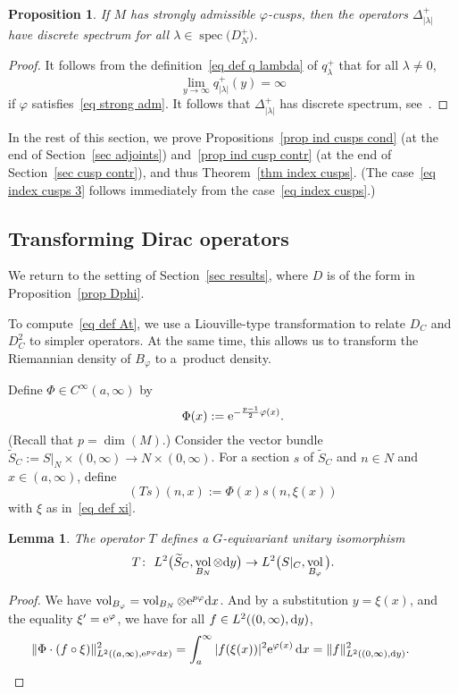 \documentclass[pdftex]{sigma}%
\numberwithin{equation}{section}
\newtheorem{Lemma}[Theorem]{Lemma}
\newtheorem{Proposition}[Theorem]{Proposition}
 { \theoremstyle{definition}
\newtheorem{Definition}[Theorem]{Definition}
\newtheorem{Note}[Theorem]{Note}
\newtheorem{Example}[Theorem]{Example}
\newtheorem{Remark}[Theorem]{Remark} }
\DeclareMathOperator{\spec}{spec}
\DeclareMathOperator{\vol}{vol}
\begin{document}
\begin{Proposition}\label{prop discrete spec}
If $M$ has strongly admissible $\varphi$-cusps, then the operators $\Delta_{|\lambda|}^{+}$ have discrete spectrum for all $\lambda \in \spec\big(D_N^+\big)$.
\end{Proposition}
\begin{proof}
It follows from the definition~\eqref{eq def q lambda} of $q_{\lambda}^{+}$ that for all $\lambda \not=0$,
\[
\lim_{y \to \infty}q_{|\lambda|}^{+}(y) = \infty
\]
if $\varphi$ satisfies~\eqref{eq strong adm}. It follows that $\Delta_{|\lambda|}^{+}$ has discrete spectrum, see~\cite[Theorem~1.3.1, Lemma~3.1.1 and equation~(1.3)]{Levitan91}.
\end{proof}

In the rest of this section, we prove Propositions~\ref{prop ind cusps cond} (at the end of Section~\ref{sec adjoints}) and~\ref{prop ind cusp contr} (at the end of Section~\ref{sec cusp contr}), and thus Theorem~\ref{thm index cusps}. (The case~\eqref{eq index cusps 3} follows immediately from the case~\eqref{eq index cusps}.)

\subsection{Transforming Dirac operators}

We return to the setting of Section~\ref{sec results}, where $D$ is of the form in Proposition~\ref{prop Dphi}.

To compute~\eqref{eq def At}, we use a Liouville-type transformation to relate $D_C$ and $D_C^2$ to simpler operators. At the same time, this allows us to transform the Riemannian density of $B_{\varphi}$ to a~product density.

Define $\Phi \in C^{\infty}(a, \infty)$ by
\begin{equation} \label{eq def Phi}
\Phi(x) := {\rm e}^{-\frac{p-1}{2}\varphi(x)}.
\end{equation}
(Recall that $p = \dim(M)$.)
Consider the vector bundle $\widetilde{S}_C := S|_N \times (0,\infty) \to N \times (0, \infty)$. For a section $s$ of $\widetilde{S}_C$ and $n \in N$ and $x \in (a,\infty)$, define
\[
(Ts)(n,x) := \Phi(x) s(n, \xi(x))
\]
with $\xi$ as in~\eqref{eq def xi}.
\begin{Lemma}\label{lem T isom}
The operator $T$ defines a $G$-equivariant unitary isomorphism
\[
T\colon \ L^2\big(\widetilde{S}_C, \vol_{B_N} \otimes {\rm d}y\big) \to L^2\big(S|_C, \vol_{B_{\varphi}}\big).
\]
\end{Lemma}
\begin{proof}
We have
$\vol_{B_{\varphi}} = \vol_{B_N} \otimes {\rm e}^{p\varphi} {\rm d}x$.
And by a substitution $y = \xi(x)$, and the equality $\xi' = {\rm e}^{\varphi}$, we have for all $f \in L^2( (0,\infty), {\rm d}y)$,
\begin{equation*}
\|\Phi \cdot (f \circ \xi)\|^2_{L^2( (a,\infty), {\rm e}^{p\varphi} {\rm d}x)} =
 \int_{a}^{\infty} |f(\xi(x))|^2 {\rm e}^{\varphi(x)}\, {\rm d}x = \|f\|^2_{L^2( (0,\infty), {\rm d}y)}.\tag*{\qed}
\end{equation*}
\renewcommand{\qed}{}
\end{proof}
\end{document}
